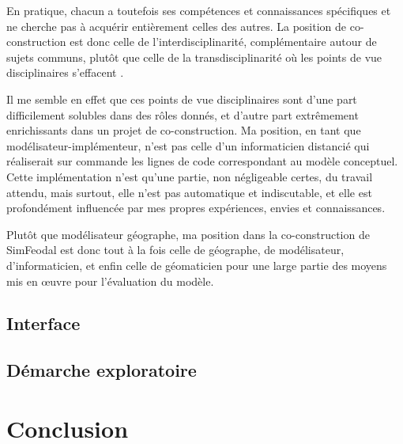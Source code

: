 En pratique, chacun a toutefois ses compétences et connaissances spécifiques et ne cherche pas à acquérir entièrement celles des autres.
La position de co-construction est donc celle de l'interdisciplinarité, complémentaire autour de sujets communs, plutôt que celle de la transdisciplinarité où les points de vue disciplinaires s'effacent \autocite[14]{gravier_deux_2018}.

Il me semble en effet que ces points de vue disciplinaires sont d'une part difficilement solubles dans des rôles donnés, et d'autre part extrêmement enrichissants dans un projet de co-construction.
Ma position, en tant que modélisateur-\fg{}implémenteur\fg{}, n'est pas celle d'un informaticien distancié qui réaliserait sur commande les lignes de code correspondant au modèle conceptuel.
Cette implémentation n'est qu'une partie, non négligeable certes, du travail attendu, mais surtout, elle n'est pas automatique et indiscutable, et elle est profondément influencée par mes propres expériences, envies et connaissances.

Plutôt que modélisateur géographe, ma position dans la co-construction de SimFeodal est donc tout à la fois celle de géographe, de modélisateur, d'informaticien, et enfin celle de géomaticien pour une large partie des moyens mis en œuvre pour l'évaluation du modèle.


\subsection{Interface}

\subsection{Démarche exploratoire}

\section*{Conclusion}
